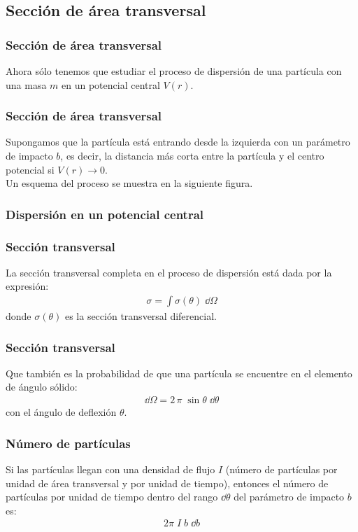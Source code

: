 \subsection{Sección de área transversal}
\begin{frame}
\frametitle{Sección de área transversal}
Ahora sólo tenemos que estudiar el proceso de dispersión de una partícula con una masa $m$ en un potencial central $V(r)$.
\end{frame}
\begin{frame}
\frametitle{Sección de área transversal}
Supongamos que la partícula está entrando desde la izquierda con un parámetro de impacto $b$, es decir, la distancia más corta entre la partícula y el centro potencial si $V(r) \to 0$. 
\\
\bigskip
Un esquema del proceso se muestra en la siguiente figura.
\end{frame}
\begin{frame}[fragile]
\frametitle{Dispersión en un potencial central}
\begin{figure}
\centering

\end{figure}
\end{frame}
\begin{frame}
\frametitle{Sección transversal}
La sección transversal completa en el proceso de dispersión está dada por la expresión:
\begin{align*}
\sigma = \int \sigma (\theta) \; \dd{\Omega}
\end{align*}
donde $\sigma(\theta)$ es la sección transversal diferencial.
\end{frame}
\begin{frame}
\frametitle{Sección transversal}
Que también es la probabilidad de que una partícula se encuentre en el elemento de ángulo sólido:
\begin{align*}
\dd{\Omega} = 2 \, \pi \; \sin \theta \; \dd{\theta}
\end{align*}
con el ángulo de deflexión $\theta$.
\end{frame}
\begin{frame}
\frametitle{Número de partículas}
Si las partículas llegan con una densidad de flujo $I$ (número de partículas por unidad de área transversal y por unidad de tiempo), entonces el número de partículas por unidad de tiempo dentro del rango $\dd{\theta}$ del parámetro de impacto $b$ es:
\begin{align*}
2 \pi \; I \; b \; \dd{b}
\end{align*}
\end{frame}
